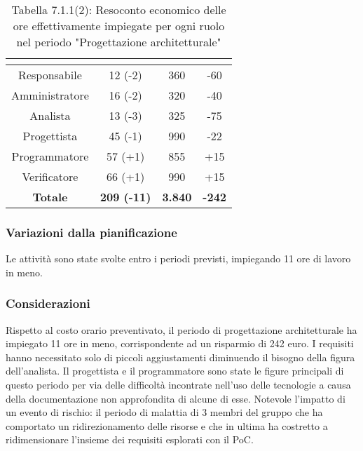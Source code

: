 \renewcommand{\arraystretch}{1.4}
\begin{table}[H]
\begin{center}
\begin{tabular}{|c|c|c|c|}
\hline
\rowcolor{title_row}
\textbf{\color{title_text}{Ruolo}}  & \textbf{\color{title_text}{Ore}} & \textbf{\color{title_text}{Costo in \euro}} & \textbf{\color{title_text}{Differenza al preventivo in \euro}} \\ \hline
Responsabile    & 12 (-2) & 360 & -60 \\ \hline
Amministratore  & 16 (-2) & 320 &  -40 \\ \hline
Analista        & 13 (-3) & 325 & -75 \\ \hline
Progettista     & 45 (-1) & 990 & -22 \\ \hline
Programmatore   & 57 (+1) & 855 & +15  \\ \hline
Verificatore    & 66 (+1) & 990 & +15  \\ \hline
\textbf{Totale} & \textbf{209 (-11)}    & \textbf{3.840} & \textbf{-242} \\ \hline
\end{tabular}
\caption{Tabella 7.1.1(2): Resoconto economico delle ore effettivamente impiegate per ogni ruolo nel periodo "Progettazione architetturale"\label{}}
\end{center}
\end{table}
\renewcommand{\arraystretch}{1}


\subsubsection{Variazioni dalla pianificazione}
Le attività sono state svolte entro i periodi previsti, impiegando 11 ore di lavoro in meno.

\subsubsection{Considerazioni}
Rispetto al costo orario preventivato, il periodo di progettazione architetturale ha impiegato 11 ore in meno, corrispondente ad un risparmio di 242 euro.
I requisiti hanno necessitato solo di piccoli aggiustamenti diminuendo il bisogno della figura dell'analista. Il progettista e il programmatore sono state
le figure principali di questo periodo per via delle difficoltà incontrate nell'uso delle tecnologie a causa della documentazione non approfondita di alcune di esse.
Notevole l'impatto di un evento di rischio: il periodo di malattia di 3 membri del gruppo che ha comportato un ridirezionamento delle risorse e che in ultima ha costretto a ridimensionare l'insieme dei requisiti esplorati con il PoC.
\pagebreak
